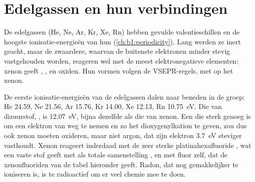 \section{Edelgassen en hun verbindingen}

De edelgassen (He, Ne, Ar, Kr, Xe, Rn) hebben gevulde valentieschillen en
de hoogste ionisatie-energieën van hun  (\cref{ch:b1:periodicity}).
Lang werden ze inert geacht, maar de zwaardere, waarvan de buitenste
elektronen minder stevig vastgehouden worden, reageren wel met de meest
elektronegatieve elementen: xenon geeft , , 
en oxiden. Hun vormen volgen de VSEPR-regels, met  op het
xenon.

\begin{example}
De eerste ionisatie-energieën van de edelgassen dalen naar beneden in de
groep: He 24.59, Ne 21.56, Ar 15.76, Kr 14.00, Xe 12.13, Rn 10.75~eV. Die
van dizuurstof, , is 12.07~eV, bijna dezelfde als die
van xenon. Een  die sterk genoeg is om een elektron van 
weg te nemen en zo het dioxygenylkation  te geven, zou dus ook
xenon moeten oxideren, maar niet argon, dat zijn elektron 3.7~eV steviger
vasthoudt. Xenon reageert inderdaad met de zeer sterke 
platinahexafluoride , wat een vaste stof geeft met als totale
samenstelling , en met fluor zelf, dat de xenonfluoriden van
de tabel hieronder geeft. Radon, dat nog gemakkelijker te ioniseren is,
is te radioactief om er veel chemie mee te doen.
\end{example}

